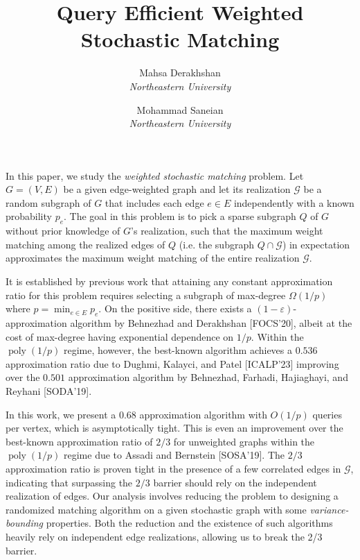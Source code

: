 \documentclass[letterpaper,11pt]{article}
\title{Query Efficient Weighted Stochastic Matching}
\author{
Mahsa Derakhshan \\ {\em Northeastern University} \and Mohammad Saneian  \\ {\em Northeastern University}
}
\date{}
\renewcommand{\epsilon}{\varepsilon}
\newcommand{\mc}[1]{\ensuremath{\mathcal{#1}}}
\DeclareMathOperator{\poly}{poly}
\renewcommand{\epsilon}[0]{\ensuremath{\varepsilon}}
\renewcommand{\mc}[1]{\ensuremath{\mathcal{#1}}}
\begin{document}
\maketitle

\thispagestyle{empty}
In this paper, we study the {\em weighted stochastic matching} problem. Let $G=(V, E)$ be a given edge-weighted graph and let its realization $\mathcal{G}$ be a random subgraph of $G$ that includes each edge $e\in E$ independently with a known probability $p_e$. The goal in this problem is to pick a sparse subgraph $Q$ of $G$ without prior knowledge of $G$'s realization, such that the maximum weight matching among the realized edges of $Q$ (i.e. the subgraph $Q\cap \mc{G}$) in expectation approximates the maximum weight matching of the entire realization $\mc{G}$.

It is established by previous work that attaining any constant approximation ratio for this problem requires selecting a subgraph of max-degree $\Omega(1/p)$ where $p=\min_{e\in E} p_e$. On the positive side, there  exists a $(1-\epsilon)$-approximation algorithm by Behnezhad and Derakhshan [FOCS'20],  albeit at the cost of max-degree having exponential dependence on $1/p$.
Within the $\poly(1/p)$  regime, however, the best-known algorithm  achieves a $0.536$ approximation ratio due to Dughmi, Kalayci, and Patel [ICALP'23] improving over the $0.501$ approximation algorithm by Behnezhad, Farhadi, Hajiaghayi, and Reyhani [SODA'19]. 


In this work, we present a 0.68 approximation algorithm with $O(1/p)$ queries per vertex, which is asymptotically tight. This is even an improvement over the best-known approximation ratio of $2/3$ for unweighted graphs within the $\poly(1/p)$ regime due to Assadi and Bernstein [SOSA'19]. The $2/3$ approximation  ratio is proven tight in the presence of a few correlated edges in $\mathcal{G}$, indicating that surpassing the $2/3$ barrier  should rely on the independent realization of edges. Our analysis involves reducing the problem to designing a randomized matching algorithm on a given stochastic graph with some \emph{variance-bounding} properties. 
Both the reduction and the existence of such algorithms heavily rely on independent edge realizations, allowing us to break the 2/3 barrier. 
 


\clearpage
\setcounter{page}{1}
\end{document}
